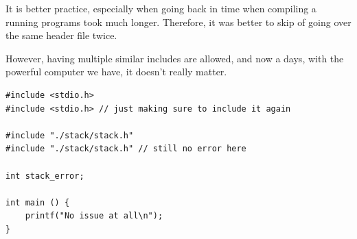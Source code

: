 \pagebreak
{}

It is better practice, especially when going back in time when compiling a running programs took much longer. Therefore, it was better to skip of going over the same header file twice.

However, having multiple similar includes are allowed, and now a days, with the powerful computer we have, it doesn't really matter.



\begin{lstlisting}
#include <stdio.h>
#include <stdio.h> // just making sure to include it again

#include "./stack/stack.h"
#include "./stack/stack.h" // still no error here

int stack_error;

int main () {
    printf("No issue at all\n");
}
\end{lstlisting}

